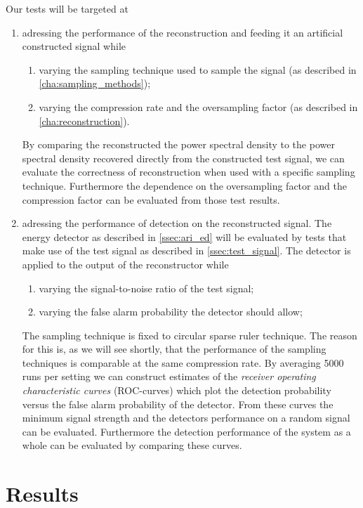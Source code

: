 \documentclass[a4paper, openany, oneside]{memoir}
\begin{document}
Our tests will be targeted at
\begin{enumerate}
	\item adressing the performance of the reconstruction and feeding it an artificial constructed signal while
	\begin{enumerate}
		\item varying the sampling technique used to sample the signal (as described in \cref{cha:sampling_methods});
		\item varying the compression rate and the oversampling factor (as described in \cref{cha:reconstruction}).
	\end{enumerate}
	By comparing the reconstructed the power spectral density to the power spectral density recovered directly from the constructed test signal, we can evaluate the correctness of reconstruction when used with a specific sampling technique.
	Furthermore the dependence on the oversampling factor and the compression factor can be evaluated from those test results. 
	\item adressing the performance of detection on the reconstructed signal. The energy detector as described in \cref{ssec:ari_ed} will be evaluated by tests that make use of the test signal as described in \cref{ssec:test_signal}. 
	The detector is applied to the output of the reconstructor while	
	\begin{enumerate}
		\item varying the signal-to-noise ratio of the test signal; 
		\item varying the false alarm probability the detector 
		should allow;
	\end{enumerate}

	The sampling technique is fixed to circular sparse ruler technique. The reason for this is, as we will see shortly, that the performance
	of the sampling techniques is comparable at the same compression rate.
	By averaging 5000 runs per setting we can construct estimates of the \emph{receiver operating characteristic curves} (ROC-curves) which plot the detection probability versus the false alarm probability of the detector. From these curves the minimum signal strength and the detectors performance on a random signal can be evaluated. Furthermore the detection performance of the system as a whole can be evaluated by comparing these curves.
	\end{enumerate}

\section{Results}
\end{document}
